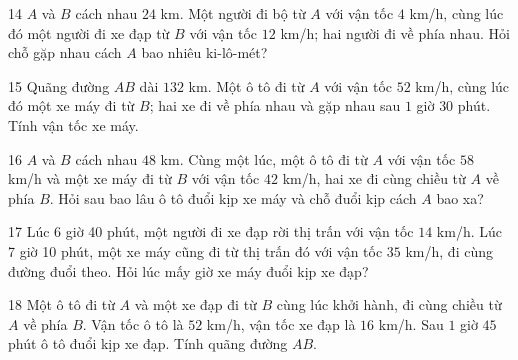\gap
\begin{probbox}{14}{\relax}
$A$ và $B$ cách nhau $24$ km. Một người đi bộ từ $A$ với vận tốc $4$ km/h, cùng lúc đó một người đi xe đạp từ $B$ với vận tốc $12$ km/h; hai người đi về phía nhau. Hỏi chỗ gặp nhau cách $A$ bao nhiêu ki-lô-mét?
\end{probbox}
\gap
\begin{probbox}{15}{\relax}
Quãng đường $AB$ dài $132$ km. Một ô tô đi từ $A$ với vận tốc $52$ km/h, cùng lúc đó một xe máy đi từ $B$; hai xe đi về phía nhau và gặp nhau sau $1$ giờ $30$ phút. Tính vận tốc xe máy.
\end{probbox}
\gap
\begin{probbox}{16}{\relax}
$A$ và $B$ cách nhau $48$ km. Cùng một lúc, một ô tô đi từ $A$ với vận tốc $58$ km/h và một xe máy đi từ $B$ với vận tốc $42$ km/h, hai xe đi cùng chiều từ $A$ về phía $B$. Hỏi sau bao lâu ô tô đuổi kịp xe máy và chỗ đuổi kịp cách $A$ bao xa?
\end{probbox}
\gap
\begin{probbox}{17}{\relax}
Lúc 6 giờ 40 phút, một người đi xe đạp rời thị trấn với vận tốc $14$ km/h. Lúc 7 giờ 10 phút, một xe máy cũng đi từ thị trấn đó với vận tốc $35$ km/h, đi cùng đường đuổi theo. Hỏi lúc mấy giờ xe máy đuổi kịp xe đạp?
\end{probbox}
\gap
\begin{probbox}{18}{\relax}
Một ô tô đi từ $A$ và một xe đạp đi từ $B$ cùng lúc khởi hành, đi cùng chiều từ $A$ về phía $B$. Vận tốc ô tô là $52$ km/h, vận tốc xe đạp là $16$ km/h. Sau $1$ giờ $45$ phút ô tô đuổi kịp xe đạp. Tính quãng đường $AB$.
\end{probbox}
